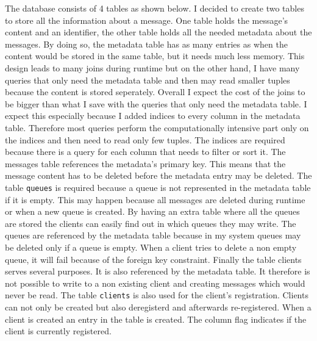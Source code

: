 \documentclass[
10pt, %
a4paper, %
oneside, %
headinclude,footinclude, %
BCOR5mm, %
]{scrartcl}
\begin{document}
The database consists of 4 tables as shown below. I decided to create two tables to store all the information about a message. One table holds the message's content and an identifier, the other table holds all the needed metadata about the messages. By doing so, the metadata table has as many entries as when the content would be stored in the same table, but it needs much less memory. This design leads to many joins during runtime but on the other hand, I have many queries that only need the metadata table and then may read smaller tuples because the content is stored seperately. Overall I expect the cost of the joins to be bigger than what I save with the queries that only need the metadata table. I expect this especially because I added indices to every column in the metadata table. Therefore most queries perform the computationally intensive part only on the indices and then need to read only few tuples. The indices are required because there is a query for each column that needs to filter or sort it. The messages table references the metadata's primary key. This means that the message content has to be deleted before the metadata entry may be deleted. The table \texttt{queues} is required because a queue is not represented in the metadata table if it is empty. This may happen because all messages are deleted during runtime or when a new queue is created. By having an extra table where all the queues are stored the clients can easily find out in which queues they may write. The queues are referenced by the metadata table because in my system queues may be deleted only if a queue is empty. When a client tries to delete a non empty queue, it will fail because of the foreign key constraint.
Finally the table clients serves several purposes. It is also referenced by the metadata table. It therefore is not possible to write to a non existing client and creating messages which would never be read. The table \texttt{clients} is also used for the client's registration. Clients can not only be created but also deregisterd and afterwards re-registered. When a client is created an entry in the table is created. The column flag indicates if the client is currently registered.
\end{document}
